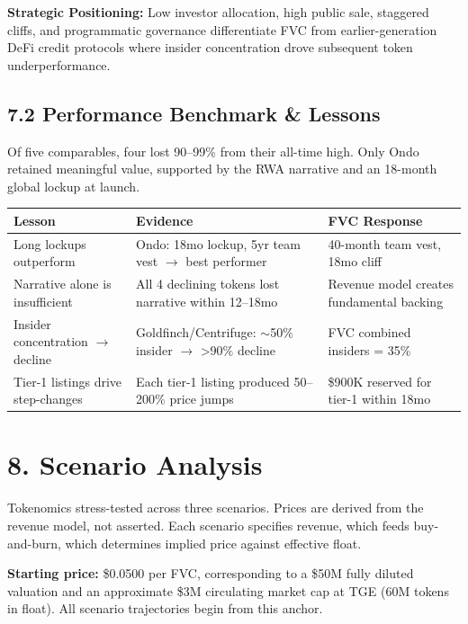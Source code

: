 \documentclass[
  paper=a4,
  ,captions=tableheading
]{scrartcl}
\begin{document}
\textbf{Strategic Positioning:} Low investor allocation, high public sale, staggered cliffs, and programmatic governance differentiate FVC from earlier-generation DeFi credit protocols where insider concentration drove subsequent token underperformance.

\subsection{7.2 Performance Benchmark \& Lessons}\label{performance-benchmark}

Of five comparables, four lost 90--99\% from their all-time high. Only Ondo retained meaningful value, supported by the RWA narrative and an 18-month global lockup at launch.

\begin{center}
\small
\begin{tabularx}{\textwidth}{Y Y Y}
\toprule
\textbf{Lesson} & \textbf{Evidence} & \textbf{FVC Response} \\
\midrule
Long lockups outperform & Ondo: 18mo lockup, 5yr team vest $\rightarrow$ best performer & 40-month team vest, 18mo cliff \\
Narrative alone is insufficient & All 4 declining tokens lost narrative within 12--18mo & Revenue model creates fundamental backing \\
Insider concentration $\rightarrow$ decline & Goldfinch/Centrifuge: $\sim$50\% insider $\rightarrow$ >90\% decline & FVC combined insiders = 35\% \\
Tier-1 listings drive step-changes & Each tier-1 listing produced 50--200\% price jumps & \$900K reserved for tier-1 within 18mo \\
\bottomrule
\end{tabularx}
\end{center}

\section{8. Scenario Analysis}\label{scenario-analysis}

Tokenomics stress-tested across three scenarios. Prices are derived from the revenue model, not asserted. Each scenario specifies revenue, which feeds buy-and-burn, which determines implied price against effective float.

\textbf{Starting price:} \$0.0500 per FVC, corresponding to a \$50M fully diluted valuation and an approximate \$3M circulating market cap at TGE (60M tokens in float). All scenario trajectories begin from this anchor.
\end{document}
